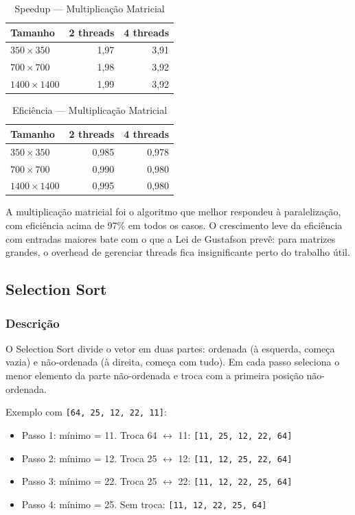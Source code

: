 \documentclass[12pt]{article}
\begin{document}
\begin{table}[H]
\centering
\caption{Speedup --- Multiplicação Matricial}
\begin{tabular}{lrr}
\toprule
\textbf{Tamanho} & \textbf{2 threads} & \textbf{4 threads} \\
\midrule
$350\times350$ & 1,97 & 3,91 \\
$700\times700$ & 1,98 & 3,92 \\
$1400\times1400$ & 1,99 & 3,92 \\
\bottomrule
\end{tabular}
\end{table}

\begin{table}[H]
\centering
\caption{Eficiência --- Multiplicação Matricial}
\begin{tabular}{lrr}
\toprule
\textbf{Tamanho} & \textbf{2 threads} & \textbf{4 threads} \\
\midrule
$350\times350$ & 0,985 & 0,978 \\
$700\times700$ & 0,990 & 0,980 \\
$1400\times1400$ & 0,995 & 0,980 \\
\bottomrule
\end{tabular}
\end{table}

A multiplicação matricial foi o algoritmo que melhor respondeu à paralelização, com eficiência acima de 97\% em todos os casos. O crescimento leve da eficiência com entradas maiores bate com o que a Lei de Gustafson prevê: para matrizes grandes, o overhead de gerenciar threads fica insignificante perto do trabalho útil.

\subsection{Selection Sort}

\subsubsection{Descrição}

O Selection Sort divide o vetor em duas partes: ordenada (à esquerda, começa vazia) e não-ordenada (à direita, começa com tudo). Em cada passo seleciona o menor elemento da parte não-ordenada e troca com a primeira posição não-ordenada.

Exemplo com \texttt{[64, 25, 12, 22, 11]}:
\begin{itemize}
    \item Passo 1: mínimo = 11. Troca 64 $\leftrightarrow$ 11: \texttt{[11, 25, 12, 22, 64]}
    \item Passo 2: mínimo = 12. Troca 25 $\leftrightarrow$ 12: \texttt{[11, 12, 25, 22, 64]}
    \item Passo 3: mínimo = 22. Troca 25 $\leftrightarrow$ 22: \texttt{[11, 12, 22, 25, 64]}
    \item Passo 4: mínimo = 25. Sem troca: \texttt{[11, 12, 22, 25, 64]}
\end{itemize}
\end{document}
